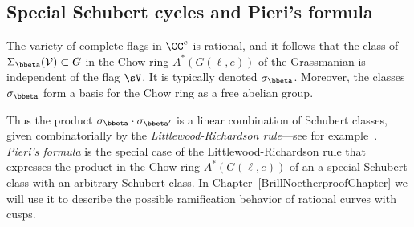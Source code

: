 \subsection{Special Schubert cycles and Pieri's formula}

\begin{fact}
The variety of complete flags in $\CC^e$ is rational, and it follows that the class of $\Sigma_{\bbeta}({\cal V})\subset G$
in the Chow ring $A^*(G(\ell, e))$ of the Grassmanian
is independent
of the flag $\sV$. It is typically denoted $\sigma_{\bbeta}$. Moreover, the classes $\sigma_{\bbeta}$ form a basis for the Chow ring as a free abelian group.
\end{fact}

Thus the product $\sigma_{\bbeta} \cdot \sigma_{\bbeta'}$ is a linear combination of Schubert classes,
given combinatorially by the \emph{Littlewood-Richardson rule}---see for example~\cite{MR2247964}.
\emph{Pieri's formula} is the special
case of the Littlewood-Richardson rule that expresses the product in the Chow ring $A^*(G(\ell, e))$ of an a special Schubert class with an arbitrary Schubert class.
In Chapter~\ref{BrillNoetherproofChapter} we will use it to describe the possible ramification behavior of rational curves with cusps.

